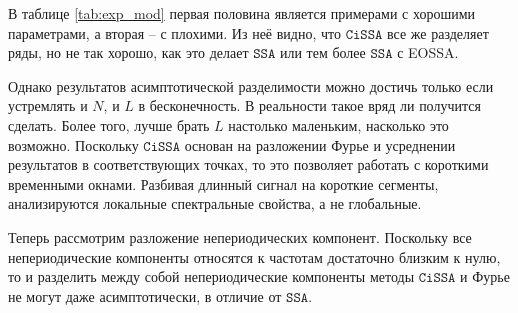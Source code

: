 \documentclass[12pt, specialist, subf
]{disser}
\theoremstyle{definition}
\newcommand{\SSA}{\texttt{SSA}}
\newcommand{\CISSA}{\texttt{CiSSA}}
\begin{document}
В таблице \ref{tab:exp_mod} первая половина является примерами с хорошими параметрами, а вторая -- с плохими. Из неё видно, что $\CISSA$ все же разделяет ряды, но не так хорошо, как это делает $\SSA$ или тем более $\SSA$ с EOSSA.

Однако результатов асимптотической разделимости можно достичь только если устремлять и $N$, и $L$ в бесконечность. В реальности такое вряд ли получится сделать. Более того, лучше брать $L$ настолько маленьким, насколько это возможно. Поскольку $\CISSA$ основан на разложении Фурье и усреднении результатов в соответствующих точках, то это позволяет работать с короткими временными окнами. Разбивая длинный сигнал на короткие сегменты, анализируются локальные спектральные свойства, а не глобальные.


Теперь рассмотрим разложение непериодических компонент. Поскольку все непериодические компоненты относятся к частотам достаточно близким к нулю, то и разделить между собой непериодические компоненты методы $\CISSA$ и Фурье не могут даже асимптотически, в отличие от $\SSA$.
\end{document}
